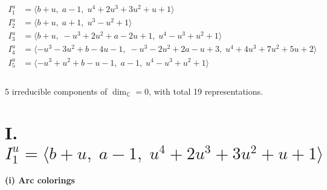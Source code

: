 \documentclass[1p]{elsarticle_modified}
\theoremstyle{definition}
\begin{document}
\begin{align*}
I^u_{1}&=\langle 
b+u,\;a-1,\;u^4+2 u^3+3 u^2+u+1\rangle \\
I^u_{2}&=\langle 
b+u,\;a+1,\;u^3- u^2+1\rangle \\
I^u_{3}&=\langle 
b+u,\;- u^3+2 u^2+a-2 u+1,\;u^4- u^3+u^2+1\rangle \\
I^u_{4}&=\langle 
- u^3-3 u^2+b-4 u-1,\;- u^3-2 u^2+2 a- u+3,\;u^4+4 u^3+7 u^2+5 u+2\rangle \\
I^u_{5}&=\langle 
- u^3+u^2+b- u-1,\;a-1,\;u^4- u^3+u^2+1\rangle \\
\\
\end{align*}
\raggedright * 5 irreducible components of $\dim_{\mathbb{C}}=0$, with total 19 representations.\\
\newpage
\renewcommand{\arraystretch}{1}
\centering \section*{I. $I^u_{1}= \langle b+u,\;a-1,\;u^4+2 u^3+3 u^2+u+1 \rangle$}
\flushleft \textbf{(i) Arc colorings}\\
\end{document}
